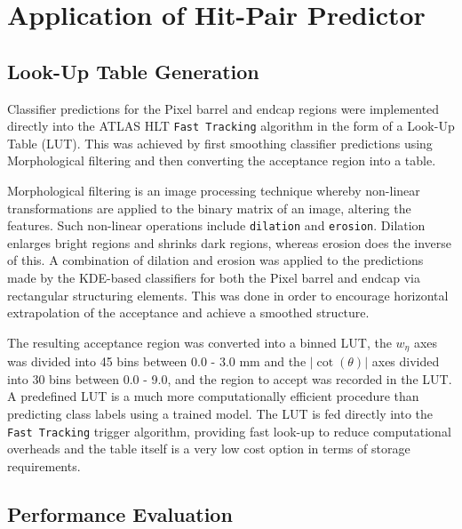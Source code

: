 \section{Application of Hit-Pair Predictor}
\label{application-of-hit-pair-predictor}

\subsection{Look-Up Table Generation}
\label{LUT-generation}

Classifier predictions for the Pixel barrel and endcap regions were implemented directly into the ATLAS HLT \texttt{Fast Tracking} algorithm in the form of a Look-Up Table (LUT). This was achieved by first smoothing classifier predictions using Morphological filtering \cite{morphological-filtering} and then converting the acceptance region into a table.

Morphological filtering is an image processing technique whereby non-linear transformations are applied to the binary matrix of an image, altering the features. Such non-linear operations include \texttt{dilation} and \texttt{erosion}. Dilation enlarges bright regions and shrinks dark regions, whereas erosion does the inverse of this. A combination of dilation and erosion was applied to the predictions made by the KDE-based classifiers for both the Pixel barrel and endcap via rectangular structuring elements. This was done in order to encourage horizontal extrapolation of the acceptance and achieve a smoothed structure. 

The resulting acceptance region was converted into a binned LUT, the $w_{\eta}$ axes was divided into 45 bins between 0.0 - 3.0 mm and the $\lvert \cot(\theta) \rvert$ axes divided into 30 bins between 0.0 - 9.0, and the region to accept was recorded in the LUT. A predefined LUT is a much more computationally efficient procedure than predicting class labels using a trained model. The LUT is fed directly into the \texttt{Fast Tracking} trigger algorithm, providing fast look-up to reduce computational overheads and the table itself is a very low cost option in terms of storage requirements. 







\subsection{Performance Evaluation}

